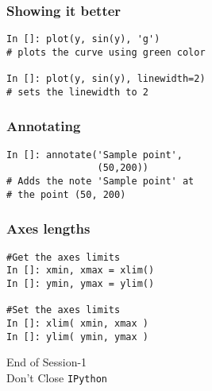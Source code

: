 \documentclass[14pt,compress]{beamer}
\newcommand{\typ}[1]{\lstinline{#1}}
\begin{document}
\begin{frame}[fragile]
\frametitle{Showing it better}
\begin{lstlisting}
In []: plot(y, sin(y), 'g')
# plots the curve using green color

In []: plot(y, sin(y), linewidth=2)
# sets the linewidth to 2  
\end{lstlisting}
\end{frame}

\begin{frame}[fragile]
\frametitle{Annotating}
\begin{lstlisting}
In []: annotate('Sample point',
                (50,200))
# Adds the note 'Sample point' at 
# the point (50, 200)
\end{lstlisting}
\end{frame}

\begin{frame}[fragile]
\frametitle{Axes lengths}
  \begin{lstlisting}
#Get the axes limits
In []: xmin, xmax = xlim() 
In []: ymin, ymax = ylim() 

#Set the axes limits
In []: xlim( xmin, xmax ) 
In []: ylim( ymin, ymax ) 
  \end{lstlisting}
\end{frame}

\begin{frame}[fragile]
  \begin{center}
  End of Session-1\\
  \alert{Don't Close \typ{IPython}}
  \end{center}
\end{frame}
\end{document}
